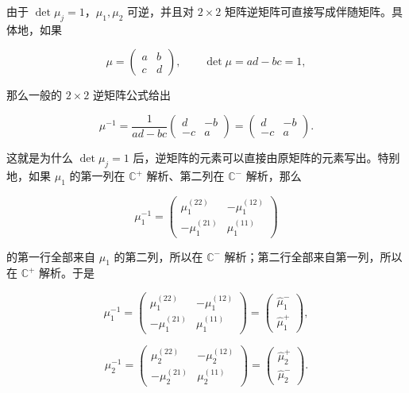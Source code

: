 \documentclass[
    lang=cn,
    scheme=chinese,
    mode=simple,
    device=normal,
    color=blue,
    math=cm,
    thmcnt=section,
    12pt,
    nowatermark
]{elegantbook}
\begin{document}
由于 $\det\mu_j=1$，$\mu_1,\mu_2$ 可逆，并且对 $2\times2$ 矩阵逆矩阵可直接写成伴随矩阵。具体地，如果

\[
    \mu=
    \begin{pmatrix}
        a & b \\
        c & d
    \end{pmatrix},
    \qquad
    \det\mu=ad-bc=1,
\]

那么一般的 $2\times2$ 逆矩阵公式给出

\[
    \mu^{-1}
    =
    \dfrac{1}{ad-bc}
    \begin{pmatrix}
        d  & -b \\
        -c & a
    \end{pmatrix}
    =
    \begin{pmatrix}
        d  & -b \\
        -c & a
    \end{pmatrix}.
\]

这就是为什么 $\det\mu_j=1$ 后，逆矩阵的元素可以直接由原矩阵的元素写出。特别地，如果 $\mu_1$ 的第一列在 $\mathbb{C}^+$ 解析、第二列在 $\mathbb{C}^-$ 解析，那么

\[
    \mu_1^{-1}
    =
    \begin{pmatrix}
        \mu_1^{(22)}  & -\mu_1^{(12)} \\
        -\mu_1^{(21)} & \mu_1^{(11)}
    \end{pmatrix}
\]

的第一行全部来自 $\mu_1$ 的第二列，所以在 $\mathbb{C}^-$ 解析；第二行全部来自第一列，所以在 $\mathbb{C}^+$ 解析。于是

\begin{equation}
    \mu_1^{-1}
    =
    \begin{pmatrix}
        \mu_1^{(22)}  & -\mu_1^{(12)} \\
        -\mu_1^{(21)} & \mu_1^{(11)}
    \end{pmatrix}
    =
    \begin{pmatrix}
        \widehat\mu_1^- \\
        \widehat\mu_1^+
    \end{pmatrix},
    \tag{5.2.22}
    \label{eq:5.2.22}
\end{equation}

\begin{equation}
    \mu_2^{-1}
    =
    \begin{pmatrix}
        \mu_2^{(22)}  & -\mu_2^{(12)} \\
        -\mu_2^{(21)} & \mu_2^{(11)}
    \end{pmatrix}
    =
    \begin{pmatrix}
        \widehat\mu_2^+ \\
        \widehat\mu_2^-
    \end{pmatrix}.
    \tag{5.2.23}
    \label{eq:5.2.23}
\end{equation}
\end{document}
